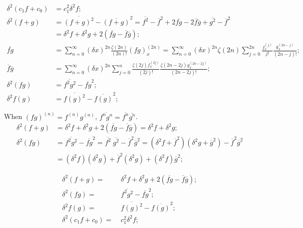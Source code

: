 \documentclass[twoside]{article}
\numberwithin{equation}{section}
\begin{document}
\begin{align*}
\delta^2 (c_1 f + c_0) &= c_1^2 \delta^2f; \\
\delta^2 (f + g) &= \overline{(f + g)^2} - \overline{(f + g)}^2 = \overline{f^2} - \overline{f}^2 + 2 \overline{f g} - 2 \overline{f} \overline{g} + \overline{g^2} - \overline{f}^2 \\
 &= \delta^2 f + \delta^2 g + 2 (\overline{fg} - \overline{f}\overline{g}); \\
\overline{f g} &= \sum_{n=0}^{\infty}(\delta x)^{2n} \frac{\zeta(2n)}{(2n)!} (f g)^{(2n)}_x 
  = \sum_{n=0}^{\infty}(\delta x)^{2n} \zeta(2n) \sum_{j=0}^{2n} \frac{f^{(j)}_x}{j!} \frac{g^{(2n - j)}_x}{(2n - j)!};  \\
\overline{f} \overline{g} &= \sum_{n=0}^{\infty}(\delta x)^{2n} \sum_{j=0}^{n} \frac{\zeta(2j) f^{(2j)}_x}{(2j)!} \frac{\zeta(2n - 2j) g^{(2n - 2j)}_x}{(2n - 2j)!};  \\
\delta^2 (f g) &= \overline{f^2 g^2} - \overline{f g}^2; \\
\delta^2 f(g) &= \overline{f(g)^2} - \overline{f(g)}^2;
\end{align*}

When $(f g)^{(n)} = f^{(n)} g^{(n)}$, $\overline{f^n g^n} = \overline{f^n} \overline{g^n}$.
\begin{align*}
\delta^2 (f + g) &= \delta^2 f + \delta^2 g + 2 (\overline{fg} - \overline{f}\overline{g}) =  \delta^2 f + \delta^2 g;  \\
\delta^2 (f g) &= \overline{f^2 g^2} - \overline{f g}^2 = \overline{f^2}\;\overline{g^2} - \overline{f}^2 \overline{g}^2
  = (\delta^2 f + \overline{f}^2)(\delta^2 g + \overline{g}^2) - \overline{f}^2 \overline{g}^2 \\
  &= (\delta^2 f) (\delta^2 g) + \overline{f}^2 (\delta^2 g) + (\delta^2 f) \overline{g}^2; 
\end{align*}

\fi

\begin{align}
\label{eqn: sum variance}
\delta^2 (f + g) =&\; \delta^2 f + \delta^2 g + 2 (\overline{fg} - \overline{f}\overline{g}); \\
\label{eqn: prod variance}
\delta^2 (f g) =&\; \overline{f^2 g^2} - \overline{f g}^2; \\
\label{eqn: composite variance}
\delta^2 f(g) =&\; \overline{f(g)^2} - \overline{f(g)}^2; \\
\label{eqn: linear variance}
\delta^2 (c_1 f + c_0) =&\; c_1^2 \delta^2f;
\end{align}
\end{document}

